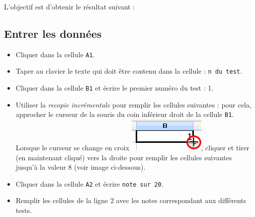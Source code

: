 
L'objectif est d'obtenir le résultat suivant :







\subsection{Entrer les données}

\begin{itemize}
\item Cliquer dans la cellule \texttt{A1}.
\item Taper au clavier le texte qui doit être contenu dans la cellule : \texttt{n du test}.
\item Cliquer dans la cellule \texttt{B1} et écrire le premier numéro du test : 1.
\item Utiliser la \emph{recopie incrémentale} pour remplir les cellules suivantes : pour cela, approcher le curseur de la souris du coin inférieur droit de la cellule \texttt{B1}. Lorsque le curseur se change en croix
\includegraphics[scale=.4]{./images/tableur/recopieIncrementale}, cliquer et tirer (en maintenant cliqué) vers la droite pour remplir les cellules suivantes jusqu'à la valeur 8 (voir image ci-dessous).
\end{itemize}


\begin{itemize}
\item Cliquer dans la cellule \texttt{A2} et écrire \texttt{note sur 20}.
\item Remplir les cellules de la ligne 2 avec les notes correspondant aux différents tests.
\end{itemize}





